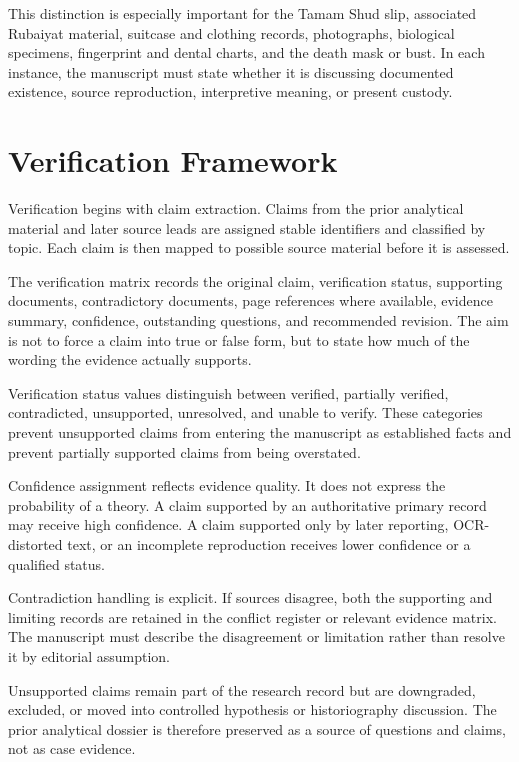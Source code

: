 This distinction is especially important for the Tamam Shud slip, associated Rubaiyat material, suitcase and clothing records, photographs, biological specimens, fingerprint and dental charts, and the death mask or bust. In each instance, the manuscript must state whether it is discussing documented existence, source reproduction, interpretive meaning, or present custody.

\section{Verification Framework}

Verification begins with claim extraction. Claims from the prior analytical material and later source leads are assigned stable identifiers and classified by topic. Each claim is then mapped to possible source material before it is assessed.

The verification matrix records the original claim, verification status, supporting documents, contradictory documents, page references where available, evidence summary, confidence, outstanding questions, and recommended revision. The aim is not to force a claim into true or false form, but to state how much of the wording the evidence actually supports.

Verification status values distinguish between verified, partially verified, contradicted, unsupported, unresolved, and unable to verify. These categories prevent unsupported claims from entering the manuscript as established facts and prevent partially supported claims from being overstated.

Confidence assignment reflects evidence quality. It does not express the probability of a theory. A claim supported by an authoritative primary record may receive high confidence. A claim supported only by later reporting, OCR-distorted text, or an incomplete reproduction receives lower confidence or a qualified status.

Contradiction handling is explicit. If sources disagree, both the supporting and limiting records are retained in the conflict register or relevant evidence matrix. The manuscript must describe the disagreement or limitation rather than resolve it by editorial assumption.

Unsupported claims remain part of the research record but are downgraded, excluded, or moved into controlled hypothesis or historiography discussion. The prior analytical dossier is therefore preserved as a source of questions and claims, not as case evidence.


